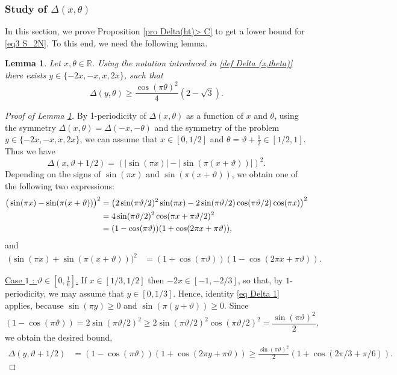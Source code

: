 \documentclass[12pt]{amsart}
\newtheorem{lem}[thm]{Lemma}
\theoremstyle{definition}
\numberwithin{equation}{section}
\numberwithin{equation}{section}
\def\R{\mathbb{R}}
\begin{document}
\subsubsection{Study of $\Delta(x,\theta)$} In this section, we prove Proposition \ref{pro Delta(ht)> C} to get a lower bound for \eqref{eq3 S_2N}.
To this end, we need the following lemma.
\begin{lem}\label{D(x)+D(2x)>theta 2}
Let \(x,\theta\in \R \). Using the notation introduced in \eqref{def Delta (x,theta)} there exists $y \in \{-2x,-x,x,2x \}$, such that
\begin{equation*}
\Delta(y,\theta) 
\geq \frac{\cos(\pi\theta)^2}{4}(2-\sqrt{3}).
\end{equation*}
\end{lem}
\begin{proof}[Proof of Lemma \ref{D(x)+D(2x)>theta 2}]
By 1-periodicity of $\Delta(x,\theta)$ as a function of $x$ and $\theta$,
using the symmetry $\Delta(x,\theta)=\Delta(-x,-\theta)$ and the symmetry of the problem $y \in \{-2x,-x,x,2x \}$, we can assume that $x\in[0,1/2]$ and $\theta = \vartheta+\frac{1}{2}\in[1/2,1]$. Thus we have 
\[ 
\Delta(x,\vartheta+1/2) = (|\sin(\pi x)|-|\sin(\pi (x+\vartheta))|)^2.
\]
Depending on the signs of
\(\sin(\pi x)\) and \(\sin(\pi(x+\vartheta))\),
we obtain one of the following two expressions:
\begin{align}\label{eq  Delta 1}
\big(\sin(\pi x)-\sin(\pi (x+\vartheta))\big)^2
    &=
    \big(2\sin(\pi\vartheta/2)^2 \sin(\pi x)-2\sin(\pi \vartheta/2)\cos(\pi\vartheta /2)\cos(\pi x)\big)^2
    \\
    &=4\sin(\pi\vartheta/2)^2
    \cos(\pi x+\pi\vartheta /2)^2 \notag
    \\
    &= (1-\cos(\pi \vartheta))(1
    +\cos(2\pi x+\pi \vartheta)),\notag
\end{align}
and
\begin{align}\label{eq  Delta 2}
\big(\sin(\pi x)+\sin(\pi (x+\vartheta))\big)^2
&= (1+\cos(\pi \vartheta))(1
    -\cos(2\pi x+\pi \vartheta)).
\end{align}

\underline{Case $1$ :  $\vartheta \in\left[0,\frac{1}{6}\right]$.} If $x\in[1/3,1/2]$ then $-2x\in[-1,-2/3]$, so that, by \(1\)-periodicity, we may assume that \(y\in[0,1/3]\). 
Hence, identity \eqref{eq Delta 1} applies, because $\sin(\pi y)\geq0$ and $\sin(\pi (y+\vartheta))\geq0$. Since $$ (1-\cos(\pi \vartheta))=2\sin(\pi\vartheta/2)^2\geq 2\sin(\pi\vartheta/2)^2\cos(\pi\vartheta/2)^2 =\frac{\sin(\pi\vartheta)^2}{2},$$
we obtain the desired bound,
\begin{align*}
\Delta(y,\vartheta+1/2) &= 
(1-\cos(\pi \vartheta))(1
    +\cos(2\pi y+\pi \vartheta)) \geq
    \frac{\sin(\pi\vartheta)^2}{2}
    (1+\cos(2\pi/3+\pi/6)).
\end{align*}


\end{proof}
\end{document}
